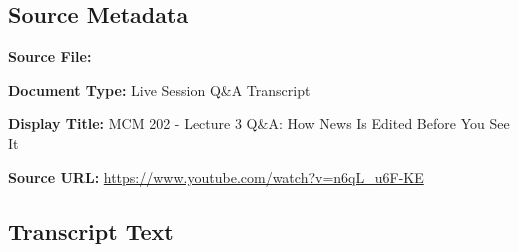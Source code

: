 \subsection*{Source Metadata}
\noindent\textbf{Source File:} \par
\noindent\textbf{Document Type:} Live Session Q\&A Transcript\par
\noindent\textbf{Display Title:} MCM 202 - Lecture 3 Q\&A: How News Is Edited Before You See It\par
\noindent\textbf{Source URL:} \url{https://www.youtube.com/watch?v=n6qL_u6F-KE}\par

\subsection*{Transcript Text}
